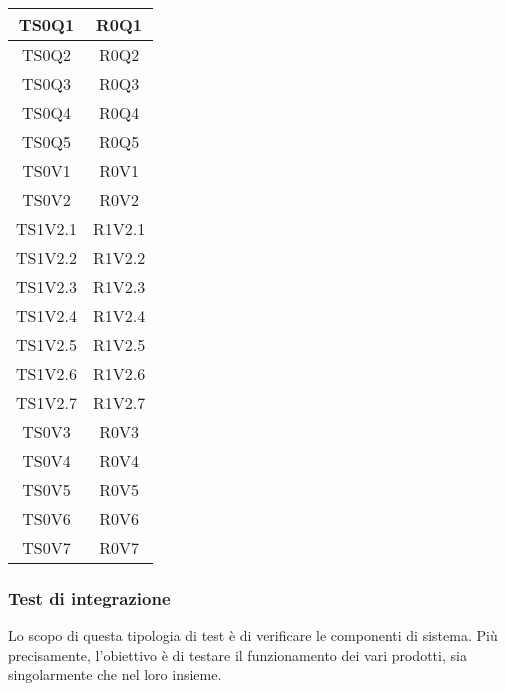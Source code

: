 \begin{longtable}{|c|c|}
    	TS0Q1&R0Q1 \\ \hline
    	TS0Q2&R0Q2 \\ \hline
    	TS0Q3&R0Q3 \\ \hline
    	TS0Q4&R0Q4 \\ \hline
    	TS0Q5&R0Q5 \\ \hline
    	
    	TS0V1&R0V1 \\ \hline
    	TS0V2&R0V2 \\ \hline
    	TS1V2.1&R1V2.1 \\ \hline
    	TS1V2.2&R1V2.2 \\ \hline
    	TS1V2.3&R1V2.3 \\ \hline
    	TS1V2.4&R1V2.4 \\ \hline
    	TS1V2.5&R1V2.5 \\ \hline
    	TS1V2.6&R1V2.6 \\ \hline
    	TS1V2.7&R1V2.7 \\ \hline
    	TS0V3&R0V3 \\ \hline
    	TS0V4&R0V4 \\ \hline
    	TS0V5&R0V5 \\ \hline
    	TS0V6&R0V6 \\ \hline
    	TS0V7&R0V7 \\ \hline
    \end{longtable}
	
	\subsubsection{Test di integrazione}
	Lo scopo di questa tipologia di test è di verificare le componenti di sistema. Più	precisamente, l’obiettivo è di testare il funzionamento dei vari  prodotti, sia singolarmente che nel loro insieme.
	
